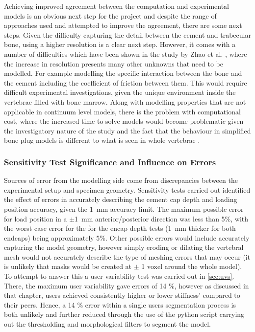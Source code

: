 Achieving improved agreement between the computation and experimental models is
an obvious next step for the project and despite the range of approaches used
and attempted to improve the agreement, there are some next steps.  Given the
difficulty capturing the detail between the cement and trabecular bone, using a
higher resolution is a clear next step.  However, it comes with a number of
difficulties which have been shown in the study by Zhao et al. \cite{Zhao2012},
where the increase in resolution presents many other unknowns that need to be
modelled.  For example modelling the specific interaction between the bone and
the cement including the  coefficient of friction between them.  This would
require difficult experimental investigations, given the unique environment
inside the vertebrae filled with bone marrow.  Along with modelling properties
that are not applicable in continuum level models, there is the problem with
computational cost, where the increased time to solve models would become
problematic given the investigatory nature of the study and the fact that the
behaviour in simplified bone plug models is different to what is seen in whole
vertebrae \cite{Sikora2013}.

\subsubsection{Sensitivity Test Significance and Influence on Errors}

Sources of error from the modelling side come from discrepancies between the
experimental setup and specimen geometry. Sensitivity tests carried out
identified the effect of errors in accurately describing the cement cap depth
and loading position accuracy, given the 1~mm accuracy limit. The maximum
possible error for load position in a $\pm$1~mm anterior/posterior direction
was less than 5\%, with the worst case error for the for the encap depth tests
(1~mm thicker for both endcaps) being approximately 5\%. Other possible errors
would include accurately capturing the model geometry, however simply eroding
or dilating the vertebral mesh would not accurately describe the type of
meshing errors that may occur (it is unlikely that masks would be created at
$\pm$ 1 voxel around the whole model). To attempt to answer this a user
variability test was carried out in \cref{sec:uvs}. There, the maximum user
variability gave errors of 14 \%, however as discussed in that chapter, users
achieved consistently higher or lower stiffness' compared to their peers.
Hence, a 14 \% error within a single users segmentation process is both
unlikely and further reduced through the use of the python script carrying out
the thresholding and morphological filters to segment the model.

